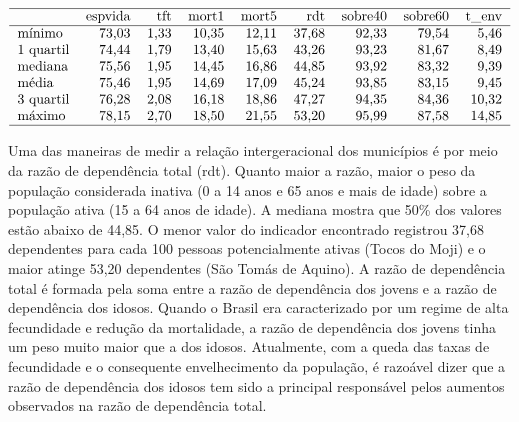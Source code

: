 \documentclass[10pt,twoside]{article}
\begin{document}
\begin{table}[!ht]
\centering
\caption{Resumo estatístico das variáveis demográficas da mesorregião Sul Sudoeste de Minas Gerais, 2010.}
\label{RE}
\[ \begin{tabular}{lrrrrrrrrr}
\hline
& espvida & tft  & mort1 & mort5 & rdt    & sobre40 & sobre60 & t\_env   \\ \hline
mínimo    & 73,03   & 1,33 & 10,35 & 12,11 & 37,68 & 92,33   & 79,54   & 5,46      \\
1 quartil & 74,44   & 1,79 & 13,40 & 15,63 & 43,26 & 93,23   & 81,67   & 8,49      \\
mediana   & 75,56   & 1,95 & 14,45 & 16,86 & 44,85 & 93,92   & 83,32   & 9,39     \\
média     & 75,46   & 1,95 & 14,69 & 17,09 & 45,24 & 93,85   & 83,15   & 9,45     \\
3 quartil & 76,28   & 2,08 & 16,18 & 18,86 & 47,27 & 94,35   & 84,36   & 10,32    \\
máximo    & 78,15   & 2,70 & 18,50 & 21,55 & 53,20 & 95,99   & 87,58   & 14,85   \\ \hline
\end{tabular} \]
\end{table}
\FloatBarrier


Uma das maneiras de medir a relação intergeracional dos municípios é por meio da razão de dependência total (rdt). Quanto maior a razão, maior o peso da população considerada inativa (0 a 14 anos e 65 anos e mais de idade) sobre a população ativa (15 a 64 anos de idade). A mediana mostra que 50\% dos valores estão abaixo de 44,85. O menor valor do indicador encontrado registrou 37,68 dependentes para cada 100 pessoas potencialmente ativas (Tocos do Moji) e o maior atinge 53,20 dependentes (São Tomás de Aquino). A razão de dependência total é formada pela soma entre a razão de dependência dos jovens e a razão de dependência dos idosos. Quando o Brasil era caracterizado por um regime de alta fecundidade e redução da mortalidade, a razão de dependência dos jovens tinha um peso muito maior que a dos idosos. Atualmente, com a queda das taxas de fecundidade e o consequente envelhecimento da população, é razoável dizer que a razão de dependência dos idosos tem sido a principal responsável pelos aumentos observados na razão de dependência total.  
\end{document}
